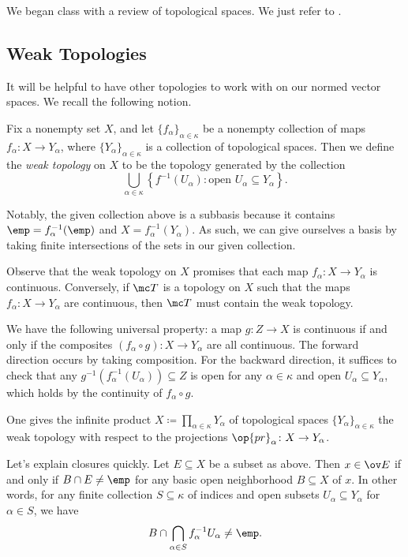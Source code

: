 \documentclass[../notes.tex]{subfiles}
\begin{document}
We began class with a review of topological spaces. We just refer to \cite{elber-top}.

\subsection{Weak Topologies}
It will be helpful to have other topologies to work with on our normed vector spaces. We recall the following notion.
\begin{definition}
	Fix a nonempty set $X$, and let $\{f_\alpha\}_{\alpha\in\kappa}$ be a nonempty collection of maps $f_\alpha\colon X\to Y_\alpha$, where $\{Y_\alpha\}_{\alpha\in\kappa}$ is a collection of topological spaces. Then we define the \textit{weak topology} on $X$ to be the topology generated by the collection
	\[\bigcup_{\alpha\in\kappa}\left\{f^{-1}(U_\alpha):\text{open }U_\alpha\subseteq Y_\alpha\right\}.\]
\end{definition}
\begin{remark}
	Notably, the given collection above is a subbasis because it contains $\emp=f_\alpha^{-1}(\emp)$ and $X=f_\alpha^{-1}(Y_\alpha)$. As such, we can give ourselves a basis by taking finite intersections of the sets in our given collection.
\end{remark}
\begin{remark}
	Observe that the weak topology on $X$ promises that each map $f_\alpha\colon X\to Y_\alpha$ is continuous. Conversely, if $\mc T$ is a topology on $X$ such that the maps $f_\alpha\colon X\to Y_\alpha$ are continuous, then $\mc T$ must contain the weak topology.
\end{remark}
\begin{remark}
	We have the following universal property: a map $g\colon Z\to X$ is continuous if and only if the composites $(f_\alpha\circ g)\colon X\to Y_\alpha$ are all continuous. The forward direction occurs by taking composition. For the backward direction, it suffices to check that any $g^{-1}\left(f_\alpha^{-1}(U_\alpha)\right)\subseteq Z$ is open for any $\alpha\in\kappa$ and open $U_\alpha\subseteq Y_\alpha$, which holds by the continuity of $f_\alpha\circ g$.
\end{remark}
\begin{example}
	One gives the infinite product $X\coloneqq\prod_{\alpha\in\kappa}Y_\alpha$ of topological spaces $\{Y_\alpha\}_{\alpha\in\kappa}$ the weak topology with respect to the projections $\op{pr}_\alpha\colon X\to Y_\alpha$.
\end{example}
\begin{remark}
	Let's explain closures quickly. Let $E\subseteq X$ be a subset as above. Then $x\in\ov E$ if and only if $B\cap E\ne\emp$ for any basic open neighborhood $B\subseteq X$ of $x$. In other words, for any finite collection $S\subseteq\kappa$ of indices and open subsets $U_\alpha\subseteq Y_\alpha$ for $\alpha\in S$, we have
	\[B\cap\bigcap_{\alpha\in S}f_\alpha^{-1}U_\alpha\ne\emp.\]
\end{remark}
\end{document}
